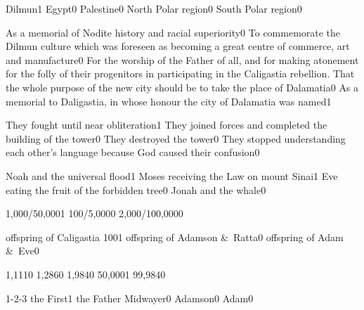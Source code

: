 {Dilmun}{1}
{Egypt}{0}
{Palestine}{0}
{North Polar region}{0}
{South Polar region}{0}
\qstop

{As a memorial of Nodite history and racial superiority}{0}
{To commemorate the Dilmun culture which was foreseen as becoming a great centre of commerce, art and manufacture}{0}
{For the worship of the Father of all, and for making atonement for the folly of their progenitors in participating in the Caligastia rebellion. That the whole purpose of the new city should be to take the place of Dalamatia}{0}
{As a memorial to Daligastia, in whose honour the city of Dalamatia was named}{1}
\qstop

{They fought until near obliteration}{1}
{They joined forces and completed the building of the tower}{0}
{They destroyed the tower}{0}
{They stopped understanding each other's language because God caused their confusion}{0}
\qstop

{Noah and the universal flood}{1}
{Moses receiving the Law on mount Sinai}{1}
{Eve eating the fruit of the forbidden tree}{0}
{Jonah and the whale}{0}
\qstop

{1,000/50,000}{1}
{100/5,000}{0}
{2,000/100,000}{0}
\qstop

{offspring of Caligastia 100}{1}
{offspring of Adamson \&\ Ratta}{0}
{offspring of Adam \&\ Eve}{0}
\qstop

{1,111}{0}
{1,286}{0}
{1,984}{0}
{50,000}{1}
{99,984}{0}
\qstop

{1-2-3 the First}{1}
{the Father Midwayer}{0}
{Adamson}{0}
{Adam}{0}
\qstop

